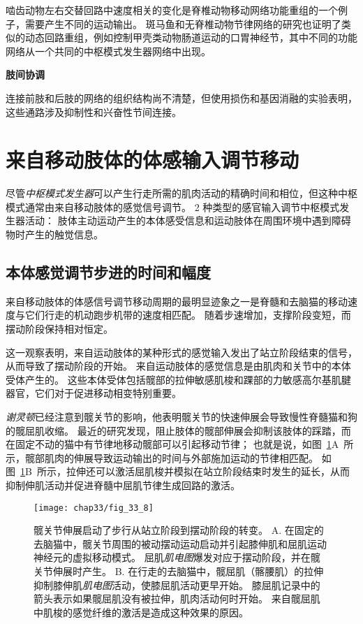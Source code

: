 啮齿动物左右交替回路中速度相关的变化是脊椎动物移动网络功能重组的一个例子，需要产生不同的运动输出。
斑马鱼和无脊椎动物节律网络的研究也证明了类似的动态回路重组，例如控制甲壳类动物肠道运动的口胃神经节，其中不同的功能网络从一个共同的中枢模式发生器网络中出现。


\textbf{肢间协调}

连接前肢和后肢的网络的组织结构尚不清楚，但使用损伤和基因消融的实验表明，这些通路涉及抑制性和兴奋性节间连接。



\section{来自移动肢体的体感输入调节移动}

尽管\textit{中枢模式发生器}可以产生行走所需的肌肉活动的精确时间和相位，但这种中枢模式通常由来自移动肢体的感觉信号调节。
2 种类型的感官输入调节中枢模式发生器活动：
肢体主动运动产生的本体感受信息和运动肢体在周围环境中遇到障碍物时产生的触觉信息。



\subsection{本体感觉调节步进的时间和幅度}

来自移动肢体的体感信号调节移动周期的最明显迹象之一是脊髓和去脑猫的移动速度与它们行走的机动跑步机带的速度相匹配。
随着步速增加，支撑阶段变短，而摆动阶段保持相对恒定。


这一观察表明，来自运动肢体的某种形式的感觉输入发出了站立阶段结束的信号，从而导致了摆动阶段的开始。
来自运动肢体的感觉信息是由肌肉和关节中的本体受体产生的。
这些本体受体包括髋部的拉伸敏感肌梭和踝部的力敏感高尔基肌腱器官，它们对于促进移动相变特别重要。


\textit{谢灵顿}已经注意到髋关节的影响，他表明髋关节的快速伸展会导致慢性脊髓猫和狗的髋屈肌收缩。
最近的研究发现，阻止肢体的髋部伸展会抑制该肢体的踩踏，而在固定不动的猫中有节律地移动髋部可以引起移动节律；
也就是说，如图~\ref{fig:33_8}A~所示，髋部肌肉的伸展导致运动输出的时间与外部施加运动的节律相匹配。
如图~\ref{fig:33_8}B~所示，拉伸还可以激活屈肌梭并模拟在站立阶段结束时发生的延长，从而抑制伸肌活动并促进脊髓中屈肌节律生成回路的激活。


\begin{figure}[htbp]
	\centering
	\texttt{[image: chap33/fig\_33\_8]}
	\caption{髋关节伸展启动了步行从站立阶段到摆动阶段的转变。
	A. 在固定的去脑猫中，髋关节周围的被动摆动运动启动并引起膝伸肌和屈肌运动神经元的虚拟移动模式。
	屈肌\textit{肌电图}爆发对应于摆动阶段，并在髋关节伸展时产生\cite{kriellaars1994mechanical}。
	B. 在行走的去脑猫中，髋屈肌（髂腰肌）的拉伸抑制膝伸肌\textit{肌电图}活动，使膝屈肌活动更早开始。
	膝屈肌记录中的箭头表示如果髋屈肌没有被拉伸，肌肉活动何时开始。
	来自髋屈肌中肌梭的感觉纤维的激活是造成这种效果的原因\cite{hiebert1996contribution}。}
	\label{fig:33_8}
\end{figure}


